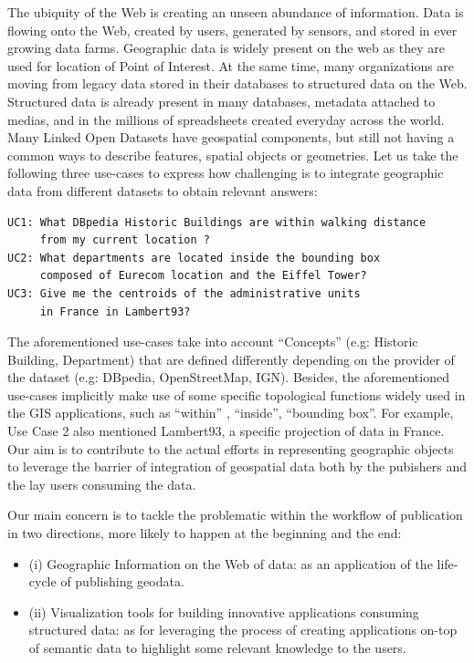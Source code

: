 The ubiquity of the Web is creating an unseen abundance of information. Data is flowing onto the Web, created by users, generated by sensors, and stored in ever growing data farms. Geographic data is widely present on the web as they are used for location of Point of Interest. At the same time, many organizations are moving from legacy data stored in their databases to structured data on the Web. Structured data is already present in many databases, metadata attached to medias, and in the millions of spreadsheets created everyday across the world. 
Many Linked Open Datasets have geospatial components, but still not having a common ways to describe features, spatial objects or geometries. Let us take the following three use-cases to express how challenging is to integrate geographic data from different datasets to obtain relevant answers: 
\begin{verbatim}
UC1: What DBpedia Historic Buildings are within walking distance 
     from my current location ?
UC2: What departments are located inside the bounding box 
     composed of Eurecom location and the Eiffel Tower? 
UC3: Give me the centroids of the administrative units 
     in France in Lambert93?

\end{verbatim} 
 The aforementioned use-cases take into account ``Concepts'' (e.g: Historic Building, Department) that are defined differently depending on the provider of the dataset (e.g: DBpedia, OpenStreetMap, IGN). Besides, the aforementioned use-cases implicitly make use of some specific topological functions widely used in the GIS applications, such as ``within'' , ``inside'', ``bounding box''. For example, Use Case 2 also mentioned Lambert93, a specific projection of data in France. Our aim is to contribute to the actual efforts in representing geographic objects to leverage the barrier of integration of geospatial data both by the pubishers and the lay users consuming the data. 

Our main concern is to tackle the problematic within the workflow of publication in two directions, more likely to happen at the beginning and the end: 
\begin{itemize}
\item (i) Geographic Information on the Web of data: as an application of the life-cycle of publishing geodata.
\item (ii) Visualization tools for building innovative applications consuming structured data: as for leveraging the process of creating applications on-top of semantic data to highlight some relevant knowledge to the users.

\end{itemize}

